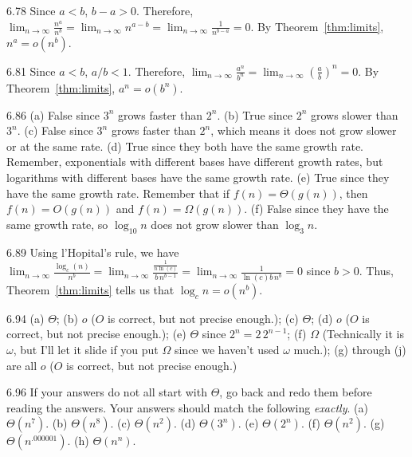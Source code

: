 \begin{Answer}{6.78}
Since $a<b$, $b-a>0$.
Therefore, $\displaystyle \lim_{n\rightarrow\infty} \frac{n^a}{n^b}
=  \lim_{n\rightarrow\infty} n^{a-b} =  \lim_{n\rightarrow\infty} \frac{1}{n^{b-a}}=0$.
By Theorem~\ref{thm:limits}, $n^a=o(n^b)$.
\end{Answer}
\begin{Answer}{6.81}
Since $a<b$, $a/b<1$.
Therefore, $\displaystyle \lim_{n\rightarrow\infty} \frac{a^n}{b^n}
=  \lim_{n\rightarrow\infty}\left(\frac{a}{b}\right)^n = 0$.
By Theorem~\ref{thm:limits}, $a^n=o(b^n)$.
\end{Answer}
\begin{Answer}{6.86}
(a) False since $3^n$ grows faster than $2^n$.
(b) True since $2^n$ grows slower than $3^n$.
(c) False since $3^n$ grows faster than $2^n$, which means it does not grow
slower or at the same rate.
(d) True since they both have the same growth rate.  Remember, exponentials with
different bases have different growth rates, but logarithms with different bases
have the same growth rate.
(e) True since they have the same growth rate.  Remember that if $f(n)=\Theta(g(n))$,
then $f(n)=O(g(n))$ and $f(n)=\Omega(g(n))$.
(f) False since they have the same growth rate, so $\log_{10} n$ does not grow slower
than $\log_3 n$.
\end{Answer}
\begin{Answer}{6.89}
Using l'Hopital's rule, we have
$\displaystyle \lim_{n\rightarrow\infty} \frac{\log_c(n)}{n^b}
=  \lim_{n\rightarrow\infty}\frac{\frac{1}{n\ln(c)}}{b\, n^{b-1}}
=  \lim_{n\rightarrow\infty}\frac{1}{\ln(c)b\, n^b}
=0$ since $b>0$.  Thus, Theorem~\ref{thm:limits} tells us that $\log_c n=o(n^b)$.
\end{Answer}
\begin{Answer}{6.94}
(a) $\Theta$;
(b) $o$ ($O$ is correct, but not precise enough.);
(c) $\Theta$;
(d) $o$ ($O$ is correct, but not precise enough.);
(e) $\Theta$ since $2^n=2\,2^{n-1}$;
(f) $\Omega$ (Technically it is $\omega$, but I'll let it slide if you put $\Omega$ since
 we haven't used $\omega$ much.);
(g) through (j) are all $o$ ($O$ is correct, but not precise enough.)
\end{Answer}
\begin{Answer}{6.96}
If your answers do not all start with $\Theta$, go back and redo them before reading the answers.  Your answers should match the following {\em exactly}.
(a) $\Theta(n^7)$.
(b) $\Theta(n^8)$.
(c) $\Theta(n^2)$.
(d) $\Theta(3^n)$.
(e) $\Theta(2^n)$.
(f) $\Theta(n^2)$.
(g) $\Theta(n^{.000001})$.
(h) $\Theta(n^n)$.
\end{Answer}
